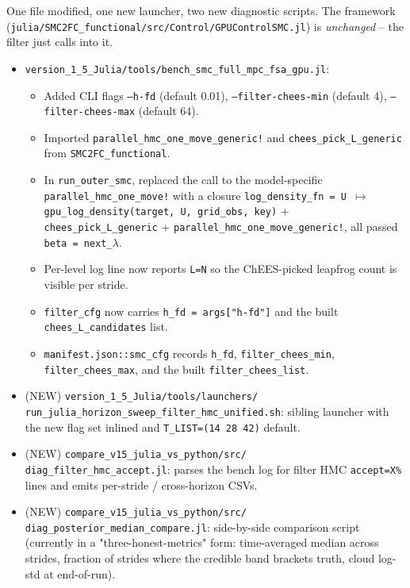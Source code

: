 \documentclass[11pt,a4paper]{article}
\begin{document}
One file modified, one new launcher, two new diagnostic scripts.
The framework
(\texttt{julia/SMC2FC\_functional/src/Control/GPUControlSMC.jl}) is
\emph{unchanged} -- the filter just calls into it.

\begin{itemize}[itemsep=2pt]
  \item \texttt{version\_1\_5\_Julia/tools/bench\_smc\_full\_mpc\_fsa\_gpu.jl}:
        \begin{itemize}[itemsep=1pt]
          \item Added CLI flags
                \texttt{--h-fd} (default 0.01),
                \texttt{--filter-chees-min} (default 4),
                \texttt{--filter-chees-max} (default 64).
          \item Imported
                \texttt{parallel\_hmc\_one\_move\_generic!} and
                \texttt{chees\_pick\_L\_generic} from
                \texttt{SMC2FC\_functional}.
          \item In \texttt{run\_outer\_smc}, replaced the call to
                the model-specific
                \texttt{parallel\_hmc\_one\_move!} with a closure
                \texttt{log\_density\_fn = U $\mapsto$
                gpu\_log\_density(target, U, grid\_obs, key)} +
                \texttt{chees\_pick\_L\_generic} +
                \texttt{parallel\_hmc\_one\_move\_generic!}, all
                passed \texttt{beta = next\_$\lambda$}.
          \item Per-level log line now reports \texttt{L=N} so the
                ChEES-picked leapfrog count is visible per stride.
          \item \texttt{filter\_cfg} now carries
                \texttt{h\_fd = args["h-fd"]} and the built
                \texttt{chees\_L\_candidates} list.
          \item \texttt{manifest.json::smc\_cfg} records
                \texttt{h\_fd}, \texttt{filter\_chees\_min},
                \texttt{filter\_chees\_max}, and the built
                \texttt{filter\_chees\_list}.
        \end{itemize}
  \item (NEW) \texttt{version\_1\_5\_Julia/tools/launchers/}\\
        \texttt{run\_julia\_horizon\_sweep\_filter\_hmc\_unified.sh}:
        sibling launcher with the new flag set inlined and
        \texttt{T\_LIST=(14 28 42)} default.
  \item (NEW) \texttt{compare\_v15\_julia\_vs\_python/src/}\\
        \texttt{diag\_filter\_hmc\_accept.jl}: parses the bench log
        for filter HMC \texttt{accept=X\%} lines and emits per-stride
        / cross-horizon CSVs.
  \item (NEW) \texttt{compare\_v15\_julia\_vs\_python/src/}\\
        \texttt{diag\_posterior\_median\_compare.jl}: side-by-side
        comparison script (currently in a "three-honest-metrics"
        form: time-averaged median across strides, fraction of
        strides where the credible band brackets truth, cloud
        log-std at end-of-run).
\end{itemize}
\end{document}

